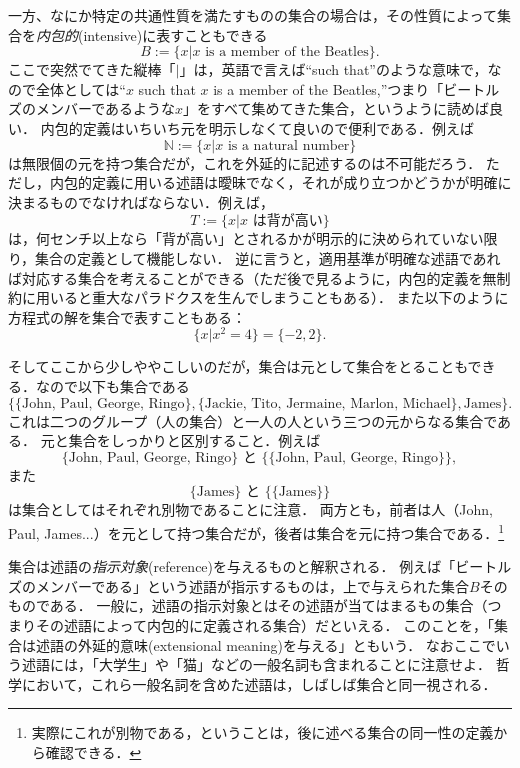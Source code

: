 \documentclass[11pt,a4paper]{jsarticle}
\begin{document}
一方、なにか特定の共通性質を満たすものの集合の場合は，その性質によって集合を\emph{内包的}(intensive)に表すこともできる
\[
 B := \{x | x \text{ is a member of the Beatles}\}.
\]
ここで突然でてきた縦棒「$|$」は，英語で言えば``such that''のような意味で，なので全体としては``$x$ such that $x$ is a member of the Beatles,''つまり「ビートルズのメンバーであるような$x$」をすべて集めてきた集合，というように読めば良い．
内包的定義はいちいち元を明示しなくて良いので便利である．例えば
\[
 \mathbb{N} := \{x | x \text{ is a natural number}\}
\]
は無限個の元を持つ集合だが，これを外延的に記述するのは不可能だろう．
ただし，内包的定義に用いる述語は曖昧でなく，それが成り立つかどうかが明確に決まるものでなければならない．例えば，
\[
 T := \{x | x \text{ は背が高い}\}
\]
は，何センチ以上なら「背が高い」とされるかが明示的に決められていない限り，集合の定義として機能しない．
逆に言うと，適用基準が明確な述語であれば対応する集合を考えることができる（ただ後で見るように，内包的定義を無制約に用いると重大なパラドクスを生んでしまうこともある）．
また以下のように方程式の解を集合で表すこともある：
\[
 \{ x | x^2 = 4\} = \{ -2, 2 \}.
\]


そしてここから少しややこしいのだが，集合は元として集合をとることもできる．なので以下も集合である
\[
\{ \{\text{John, Paul, George, Ringo}\}, \{ \text{Jackie, Tito, Jermaine, Marlon, Michael}\}, \text{James} \}.
\]
これは二つのグループ（人の集合）と一人の人という三つの元からなる集合である．
元と集合をしっかりと区別すること．例えば
\[
\{\text{John, Paul, George, Ringo}\} \text{ と } \{ \{\text{John, Paul, George, Ringo}\} \},
\]
また
\[
\{\text{James}\} \text{ と } \{ \{\text{James}\} \}  
\]
は集合としてはそれぞれ別物であることに注意．
両方とも，前者は人（John, Paul, James...）を元として持つ集合だが，後者は集合を元に持つ集合である．\footnote{実際にこれが別物である，ということは，後に述べる集合の同一性の定義から確認できる．}



\begin{rei}{}{}
集合は述語の\emph{指示対象}(reference)を与えるものと解釈される．
例えば「ビートルズのメンバーである」という述語が指示するものは，上で与えられた集合$B$そのものである．
一般に，述語の指示対象とはその述語が当てはまるもの集合（つまりその述語によって内包的に定義される集合）だといえる．
このことを，「集合は述語の外延的意味(extensional meaning)を与える」ともいう．
なおここでいう述語には，「大学生」や「猫」などの一般名詞も含まれることに注意せよ．
哲学において，これら一般名詞を含めた述語は，しばしば集合と同一視される．
\end{rei}{}{}
\end{document}
